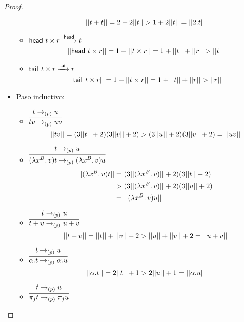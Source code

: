 \begin{proof}
\begin{itemize}
\begin{itemize}
        \begin{equation*}
          ||t + t|| = 2 + 2 ||t|| > 1 + 2 ||t|| = ||2 . t||
        \end{equation*}
        \item \( \mathsf{head}~t \times r \xrightarrow{\mathsf{head}} t \)
        \begin{equation*}
          ||\mathsf{head}~t \times r|| = 1 + ||t \times r|| = 1 + ||t|| + ||r|| > ||t||
        \end{equation*}
        \item \( \mathsf{tail}^{}~t \times r \xrightarrow{\mathsf{tail}} r \)
        \begin{equation*}
          ||\mathsf{tail}^{}~t \times r|| = 1 + ||t \times r|| = 1 + ||t|| + ||r|| > ||r||
        \end{equation*}
      \end{itemize}
    \item Paso inductivo:
      \begin{itemize}
        \item \( \infer{\app{t}{v} \reducesto_{(p)} \app{u}{v}}{t \reducesto_{(p)} u} \)
          \[
            ||t v|| = (3 ||t|| + 2)(3 ||v|| + 2) > (3 ||u|| + 2)(3 ||v|| + 2) = ||u v||
          \]
        \item \( \infer{\app{(\abstr{\vrbl{x}{B}}{v})}{t} \reducesto_{(p)} \app{(\abstr{\vrbl{x}{B}}{v})}{u}}{t \reducesto_{(p)} u} \)
          \begin{equation*}
            \begin{split}
              ||(\lambda x^{B}\ldotp v) t||
              & = (3 ||(\lambda x^{B}\ldotp v)|| + 2)(3 ||t|| + 2) \\
              & > (3 ||(\lambda x^{B}\ldotp v)|| + 2)(3 ||u|| + 2) \\
              & = ||(\lambda x^{B}\ldotp v) u||
            \end{split}
          \end{equation*}
        \item \( \infer{t + v \reducesto_{(p)} u + v}{t \reducesto_{(p)} u} \)
          \[
            ||t + v|| = ||t|| + ||v|| + 2 > ||u|| + ||v|| + 2 = ||u + v||
          \]
        \item \( \infer{\alpha . t \reducesto_{(p)} \alpha . u}{t \reducesto_{(p)} u} \)
          \[
            ||\alpha . t|| = 2 ||t|| + 1 > 2 ||u|| + 1 = ||\alpha . u||
          \]
        \item \( \infer{\proj{j}{t} \reducesto_{(p)} \proj{j}{u}}{t \reducesto_{(p)} u} \)

\end{itemize}
\end{itemize}
\end{proof}
